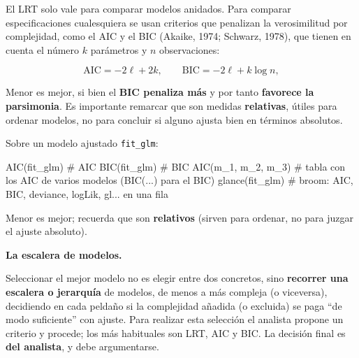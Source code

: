 \documentclass[
  letterpaper,
  DIV=11,
  numbers=noendperiod]{scrartcl}
\newenvironment{Shaded}{\begin{snugshade}}{\end{snugshade}}
\newcommand{\CommentTok}[1]{\textcolor[rgb]{0.37,0.37,0.37}{#1}}
\newcommand{\FunctionTok}[1]{\textcolor[rgb]{0.28,0.35,0.67}{#1}}
\newcommand{\NormalTok}[1]{\textcolor[rgb]{0.00,0.23,0.31}{#1}}
\begin{document}
El LRT solo vale para comparar modelos anidados. Para comparar
especificaciones cualesquiera se usan criterios que penalizan la
verosimilitud por complejidad, como el AIC y el BIC (Akaike, 1974;
Schwarz, 1978), que tienen en cuenta el número \(k\) parámetros y \(n\)
observaciones:

\[
\text{AIC}=-2\ell+2k,\qquad \text{BIC}=-2\ell+k\log n,
\]

Menor es mejor, si bien el \textbf{BIC penaliza más} y por tanto
\textbf{favorece la parsimonia}. Es importante remarcar que son medidas
\textbf{relativas}, útiles para ordenar modelos, no para concluir si
alguno ajusta bien en términos absolutos.

\begin{tcolorbox}[enhanced jigsaw, coltitle=black, rightrule=.15mm, arc=.35mm, leftrule=.75mm, colback=white, colbacktitle=quarto-callout-tip-color!10!white, left=2mm, breakable, toptitle=1mm, toprule=.15mm, bottomtitle=1mm, titlerule=0mm, title=\textcolor{quarto-callout-tip-color}{\faLightbulb}\hspace{0.5em}{🔧 En R. AIC y BIC de un modelo}, bottomrule=.15mm, opacityback=0, opacitybacktitle=0.6, colframe=quarto-callout-tip-color-frame]

Sobre un modelo ajustado \texttt{fit\_glm}:

\begin{Shaded}
\begin{Highlighting}[]
\FunctionTok{AIC}\NormalTok{(fit\_glm)              }\CommentTok{\# AIC}
\FunctionTok{BIC}\NormalTok{(fit\_glm)              }\CommentTok{\# BIC}
\FunctionTok{AIC}\NormalTok{(m\_1, m\_2, m\_3)        }\CommentTok{\# tabla con los AIC de varios modelos (BIC(...) para el BIC)}
\FunctionTok{glance}\NormalTok{(fit\_glm)           }\CommentTok{\# broom: AIC, BIC, deviance, logLik, gl... en una fila}
\end{Highlighting}
\end{Shaded}

Menor es mejor; recuerda que son \textbf{relativos} (sirven para
ordenar, no para juzgar el ajuste absoluto).

\end{tcolorbox}

\textbf{La escalera de modelos.}

Seleccionar el mejor modelo no es elegir entre dos concretos, sino
\textbf{recorrer una escalera o jerarquía} de modelos, de menos a más
compleja (o viceversa), decidiendo en cada peldaño si la complejidad
añadida (o excluida) se paga ``de modo suficiente'' con ajuste. Para
realizar esta selección el analista propone un criterio y procede; los
más habituales son LRT, AIC y BIC. La decisión final es \textbf{del
analista}, y debe argumentarse.
\end{document}
